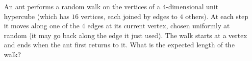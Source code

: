 An ant performs a random walk on the vertices of a $4$-dimensional unit hypercube (which has $16$ vertices, each joined by edges to $4$ others). At each step it moves along one of the $4$ edges at its current vertex, chosen uniformly at random (it may go back along the edge it just used). The walk starts at a vertex and ends when the ant first returns to it. What is the expected length of the walk?
